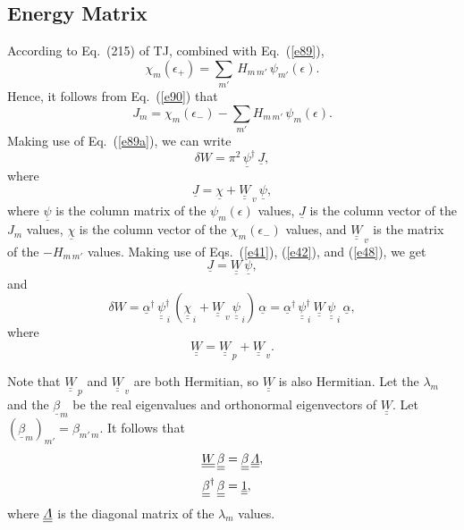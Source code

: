 \documentclass[12pt,prb,aps,notitlepage]{revtex4-1}
\begin{document}
\subsection{Energy Matrix}
According to Eq.~(215) of TJ, combined with Eq.~(\ref{e89}), 
\begin{equation}
\chi_m(\epsilon_+)=\sum_{m'}\,H_{m\,m'}\,\psi_{m'}(\epsilon).
\end{equation}
Hence, it follows from Eq.~(\ref{e90}) that
\begin{equation}
J_m = \chi_m(\epsilon_-)-\sum_{m'} H_{m\,m'}\,\psi_m(\epsilon).
\end{equation}
Making use of Eq.~(\ref{e89a}), we can write
\begin{equation}
\delta W =\pi^2\, \underline{\psi}^\dag\,\underline{J},
\end{equation}
where 
\begin{equation}
\underline{J} = \underline{\chi}+ \underline{\underline{W}}_{\,v}\,\underline{\psi},
\end{equation}
where  $\underline{\psi}$ is the column matrix of the $\psi_m(\epsilon)$ values, $\underline{J}$ is the column vector of the $J_m$ values, $\underline{\chi}$ is the column vector of the $\chi_m(\epsilon_-)$ values,
and $\underline{\underline{W}}_{\,v}$ is the matrix of the $-H_{m\,m'}$ values. 
Making use of Eqs.~(\ref{e41}), (\ref{e42}), and (\ref{e48}), we get 
\begin{equation}
\underline{J} = \underline{\underline{W}}\,\underline{\psi},
\end{equation}
and
\begin{equation}
\delta W = \underline{\alpha}^\dag\,\underline{\underline{\psi}}^{\dag}_{\,i}\,(\underline{\underline{\chi}}_{\,i} + \underline{\underline{W}}_{\,v}\,\underline{\underline{\psi}}_{\,i})\,\underline{\alpha}=  \underline{\alpha}^\dag\,\underline{\underline{\psi}}^{\dag}_{\,i}\,\underline{\underline{W}}\,\underline{\underline{\psi}}_{\,i}\,\underline{\alpha},
\end{equation}
where
\begin{equation}
\underline{\underline{W}}=\underline{\underline{W}}_{\,p}+\underline{\underline{W}}_{\,v}.
\end{equation}

Note that $\underline{\underline{W}}_{\,p}$ and $\underline{\underline{W}}_{\,v}$ are both Hermitian, so $\underline{\underline{W}}$ is also
Hermitian. Let 
 the  $\lambda_m$ and the $\underline{\beta}_m$ be the real eigenvalues and orthonormal eigenvectors of $\underline{\underline{W}}$. Let $(\underline{\beta}_m)_{m'} = \beta_{m'\,m}$. It follows that 
 \begin{align}
\underline{\underline{W}}\,\underline{\underline{\beta}}&=\underline{\underline{\beta}}\,\underline{\underline{{\mit\Lambda}}},\\[0.5ex]
\underline{\underline{\beta}}^\dag\,\underline{\underline{\beta}}&= \underline{\underline{1}},\label{e56a}
\end{align}
where $\underline{\underline{\mit\Lambda}}$ is the diagonal matrix of the $\lambda_m$ values. 
\end{document}
